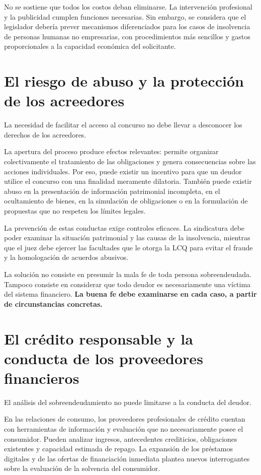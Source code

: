 \documentclass[12pt,oneside]{book}
\begin{document}
No se sostiene que todos los costos deban eliminarse. La intervención profesional y la publicidad cumplen funciones necesarias. Sin embargo, se considera que el legislador debería prever mecanismos diferenciados para los casos de insolvencia de personas humanas no empresarias, con procedimientos más sencillos y gastos proporcionales a la capacidad económica del solicitante.

\section{El riesgo de abuso y la protección de los acreedores}

La necesidad de facilitar el acceso al concurso no debe llevar a desconocer los derechos de los acreedores.

La apertura del proceso produce efectos relevantes: permite organizar colectivamente el tratamiento de las obligaciones y genera consecuencias sobre las acciones individuales. Por eso, puede existir un incentivo para que un deudor utilice el concurso con una finalidad meramente dilatoria. También puede existir abuso en la presentación de información patrimonial incompleta, en el ocultamiento de bienes, en la simulación de obligaciones o en la formulación de propuestas que no respeten los límites legales.

La prevención de estas conductas exige controles eficaces. La sindicatura debe poder examinar la situación patrimonial y las causas de la insolvencia, mientras que el juez debe ejercer las facultades que le otorga la LCQ para evitar el fraude y la homologación de acuerdos abusivos.

La solución no consiste en presumir la mala fe de toda persona sobreendeudada. Tampoco consiste en considerar que todo deudor es necesariamente una víctima del sistema financiero. \textbf{La buena fe debe examinarse en cada caso, a partir de circunstancias concretas.}

\section{El crédito responsable y la conducta de los proveedores financieros}

El análisis del sobreendeudamiento no puede limitarse a la conducta del deudor.

En las relaciones de consumo, los proveedores profesionales de crédito cuentan con herramientas de información y evaluación que no necesariamente posee el consumidor. Pueden analizar ingresos, antecedentes crediticios, obligaciones existentes y capacidad estimada de repago. La expansión de los préstamos digitales y de las ofertas de financiación inmediata plantea nuevos interrogantes sobre la evaluación de la solvencia del consumidor.
\end{document}
